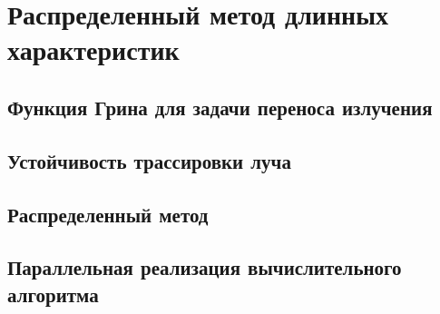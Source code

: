 \chapter{Распределенный метод длинных характеристик}

\section{Функция Грина для задачи переноса излучения}

\section{Устойчивость трассировки луча}

\section{Распределенный метод}

\section{Параллельная реализация вычислительного алгоритма}